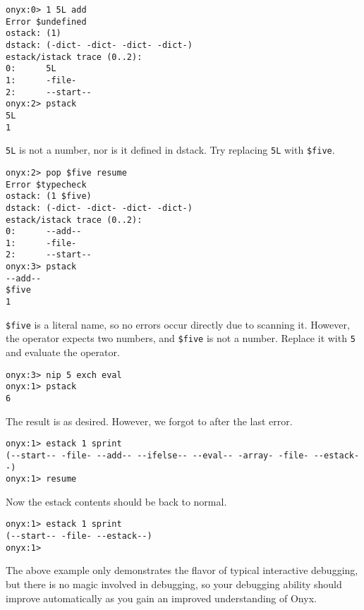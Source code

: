\begin{verbatim}
onyx:0> 1 5L add
Error $undefined
ostack: (1)
dstack: (-dict- -dict- -dict- -dict-)
estack/istack trace (0..2):
0:      5L
1:      -file-
2:      --start--
onyx:2> pstack
5L
1
\end{verbatim}

{\tt 5L} is not a number, nor is it defined in dstack.  Try replacing {\tt 5L}
with {\tt \$five}.

\begin{verbatim}
onyx:2> pop $five resume
Error $typecheck
ostack: (1 $five)
dstack: (-dict- -dict- -dict- -dict-)
estack/istack trace (0..2):
0:      --add--
1:      -file-
2:      --start--
onyx:3> pstack
--add--
$five
1
\end{verbatim}

{\tt \$five} is a literal name, so no errors occur directly due to scanning it.
However, the  operator expects two
numbers, and {\tt \$five} is not a number.  Replace it with {\tt 5} and evaluate
the operator.

\begin{verbatim}
onyx:3> nip 5 exch eval
onyx:1> pstack
6
\end{verbatim}

The result is as desired.  However, we forgot to
 after the last error.

\begin{verbatim}
onyx:1> estack 1 sprint
(--start-- -file- --add-- --ifelse-- --eval-- -array- -file- --estack--)
onyx:1> resume
\end{verbatim}

Now the estack contents should be back to normal.

\begin{verbatim}
onyx:1> estack 1 sprint
(--start-- -file- --estack--)
onyx:1> 
\end{verbatim}

The above example only demonstrates the flavor of typical interactive debugging,
but there is no magic involved in debugging, so your debugging ability should
improve automatically as you gain an improved understanding of Onyx.